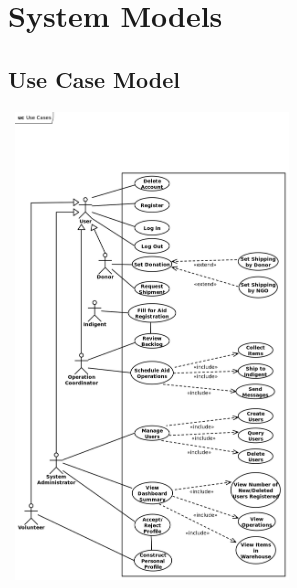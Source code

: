 \documentclass[a4paper,12pt]{report}
\begin{document}
	\chapter{System Models}
	\section{Use Case Model}
		\includegraphics[width=216pt,height=351pt]{use_case_diagram.png} %
		\\ \\
\end{document}
